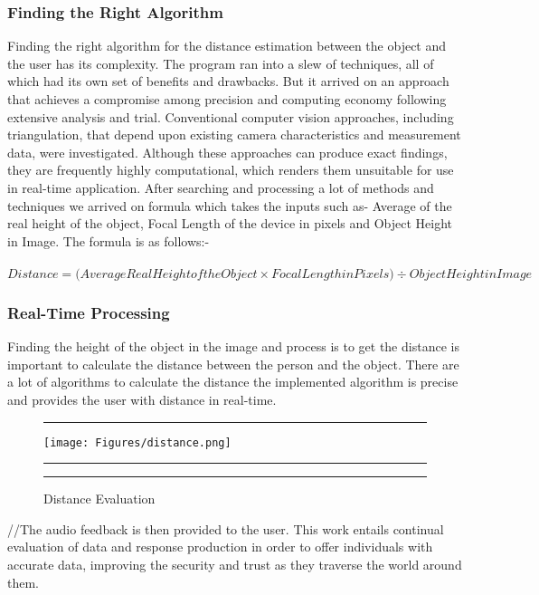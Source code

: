 \documentclass[MScCS]{uccthesis}
\begin{document}
\subsubsection{Finding the Right Algorithm}

Finding the right algorithm for the distance estimation between the object and the user has its complexity. The program ran into a slew of techniques, all of which had its own set of benefits and drawbacks. But it arrived on an approach that achieves a compromise among precision and computing economy following extensive analysis and trial. Conventional computer vision approaches, including triangulation, that depend upon existing camera characteristics and measurement data, were investigated. Although these approaches can produce exact findings, they are frequently highly computational, which renders them unsuitable for use in real-time application. After searching and processing a lot of methods and techniques we arrived on formula which takes the inputs such as- Average of the real height of the object, Focal Length of the device in pixels and Object Height in Image. The formula is as follows:-\\
\\ \textbf{
\begin{math}Distance =   \big(Average Real Height of the Object  \times Focal Length in Pixels\big)    \div Object Height in Image
\end{math}}
                                              


\subsubsection{Real-Time Processing}
Finding the height of the object in the image and process is to get the distance is important to calculate the distance between the person and the object. There are a lot of algorithms to calculate the distance the implemented algorithm is precise and provides the user with distance in real-time. \begin{figure}[hbtp]
      \hrule
      \vspace{0.5em}
     \centering
      \texttt{[image: Figures/distance.png]}
      \vspace{0.5em}
      \hrule
      \caption{\label{fig:task-TR}Distance Evaluation }
      \vspace{0.5em}
      \hrule
   \end{figure}//The audio feedback is then provided to the user. This work entails continual evaluation of data and response production in order to offer individuals with accurate data, improving the security and trust as they traverse the world around them.
\end{document}
